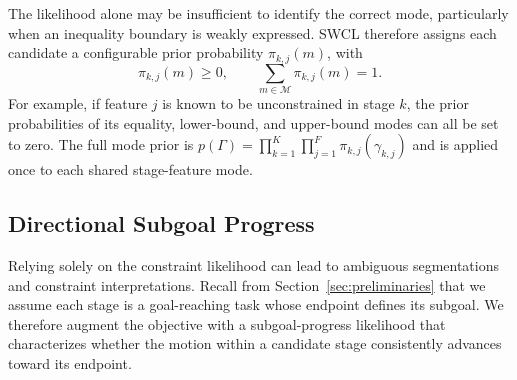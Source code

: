 The likelihood alone may be insufficient to identify the correct mode, particularly when an inequality boundary is weakly expressed. SWCL therefore assigns each candidate a configurable prior probability $\pi_{k,j}(m)$, with
\begin{equation}
\pi_{k,j}(m)\geq0,
\qquad
\sum_{m\in\mathcal{M}}\pi_{k,j}(m)=1.
\label{eq:constraint_mode_prior}
\end{equation}
For example, if feature $j$ is known to be unconstrained in stage $k$, the prior probabilities of its equality, lower-bound, and upper-bound modes can all be set to zero. The full mode prior is $p(\Gamma)=\prod_{k=1}^{K}\prod_{j=1}^{F}\pi_{k,j}(\gamma_{k,j})$ and is applied once to each shared stage-feature mode.

\subsection{Directional Subgoal Progress}
\label{sec:directional_progress}

Relying solely on the constraint likelihood can lead to ambiguous segmentations and constraint interpretations. Recall from Section~\ref{sec:preliminaries} that we assume each stage is a goal-reaching task whose endpoint defines its subgoal. We therefore augment the objective with a subgoal-progress likelihood that characterizes whether the motion within a candidate stage consistently advances toward its endpoint.

